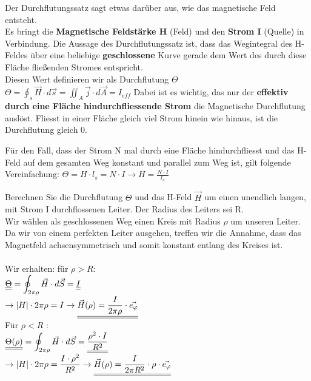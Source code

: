 \begingl
Der Durchflutungssatz sagt etwas darüber aus, wie das magnetische Feld entsteht. \\
Es bringt die \textbf{Magnetische Feldstärke H} (Feld) und den \textbf{Strom I} (Quelle) in Verbindung.
Die Aussage des Durchflutungssatz ist, dass das Wegintegral des H-Feldes über eine beliebige \textbf{geschlossene} Kurve gerade dem Wert des durch diese Fläche fließenden Stromes entspricht. \\
Diesen Wert definieren wir als Durchflutung $\Theta$ \\
\formulaBegin
$\displaystyle \Theta = \oint_{s} \vec{H} \cdot d\vec{s} = \iint_{A} \vec{j} \cdot d\vec{A} = I_{eff}$
\formulaEnd
Dabei ist es wichtig, das nur der \textbf{effektiv durch eine Fläche hindurchfliessende Strom} die Magnetische Durchflutung auslöst. Fliesst in einer Fläche gleich viel Strom hinein wie hinaus, ist die Durchflutung gleich 0.
\iend

\begingl
Für den Fall, dass der Strom N mal durch eine Fläche hindurchfliesst und das H-Feld auf dem gesamten Weg konstant und parallel zum Weg ist, gilt folgende Vereinfachung:
\formulaBegin
$\displaystyle \Theta = H \cdot l_s = N\cdot I \rightarrow H = \frac{N \cdot I}{l_s}$
\formulaEnd
\iend

\beginbsp
Berechnen Sie die Durchflutung $\Theta$ und das H-Feld $\vec{H}$ um einen unendlich langen, mit Strom I durchflossenen Leiter. Der Radius des Leiters sei R. \\
\iend
{}
\beginbsp
Wir wählen als geschlossenen Weg einen Kreis mit Radius $\rho$ um unseren Leiter. \\
Da wir von einem perfekten Leiter ausgehen, treffen wir die Annahme, dass das Magnetfeld achsensymmetrisch und somit konstant entlang des Kreises ist. \\
\\
Wir erhalten: für  $ \rho > R$: \\
$\displaystyle  \underline{\underline{\Theta}} =  \oint_{2\pi \rho} \vec{H} \cdot d\vec{S} = \underline{\underline{I}} $ \\
$ \displaystyle \rightarrow |H| \cdot 2 \pi \rho = I \rightarrow \underline{\underline{\vec{H}(\rho) = \frac{I}{2 \pi \rho} \cdot \vec{e_{\varphi}}}} $\\

Für  $ \rho < R $ : \\
$\displaystyle  \underline{\underline{\Theta(\rho)}} =  \oint_{2\pi \rho} \vec{H} \cdot d\vec{S} =   \underline{\underline{\frac{\rho^2\cdot I}{R^2}}} 		  $ \\
$ \displaystyle \rightarrow |H| \cdot 2 \pi \rho = \frac{I \cdot \rho^2}{R^2} \rightarrow \underline{\underline{\vec{H}(\rho) = \frac{I}{2\pi R^2} \cdot \rho \cdot \vec{e_{\varphi}}}} $

